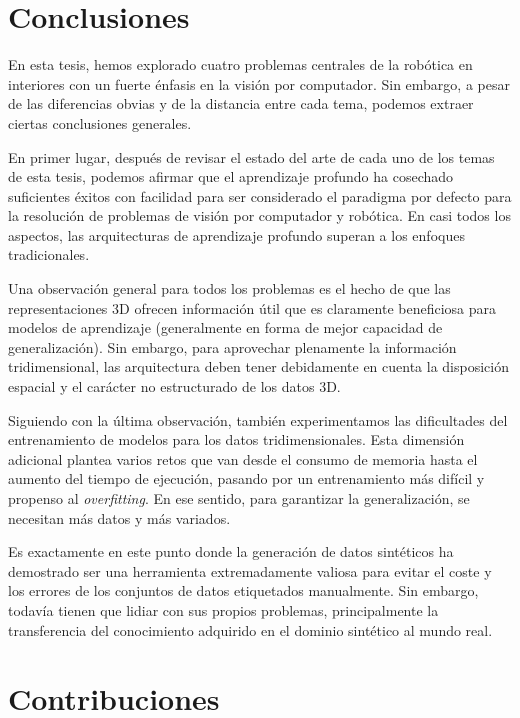 \section{Conclusiones}
\label{cha:conclusion_sp:sec:findings}

En esta tesis, hemos explorado cuatro problemas centrales de la robótica en interiores con un fuerte énfasis en la visión por computador. Sin embargo, a pesar de las diferencias obvias y de la distancia entre cada tema, podemos extraer ciertas conclusiones generales.

En primer lugar, después de revisar el estado del arte de cada uno de los temas de esta tesis, podemos afirmar que el aprendizaje profundo ha cosechado suficientes éxitos con facilidad para ser considerado el paradigma por defecto para la resolución de problemas de visión por computador y robótica. En casi todos los aspectos, las arquitecturas de aprendizaje profundo superan a los enfoques tradicionales.

Una observación general para todos los problemas es el hecho de que las representaciones \ac{3D} ofrecen información útil que es claramente beneficiosa para modelos de aprendizaje (generalmente en forma de mejor capacidad de generalización). Sin embargo, para aprovechar plenamente la información tridimensional, las arquitectura deben tener debidamente en cuenta la disposición espacial y el carácter no estructurado de los datos \ac{3D}.

Siguiendo con la última observación, también experimentamos las dificultades del entrenamiento de modelos para los datos tridimensionales. Esta dimensión adicional plantea varios retos que van desde el consumo de memoria hasta el aumento del tiempo de ejecución, pasando por un entrenamiento más difícil y propenso al \emph{overfitting}. En ese sentido, para garantizar la generalización, se necesitan más datos y más variados.

Es exactamente en este punto donde la generación de datos sintéticos ha demostrado ser una herramienta extremadamente valiosa para evitar el coste y los errores de los conjuntos de datos etiquetados manualmente. Sin embargo, todavía tienen que lidiar con sus propios problemas, principalmente la transferencia del conocimiento adquirido en el dominio sintético al mundo real.

\section{Contribuciones}
\label{cha:conclusion_sp:sec:contributions}

